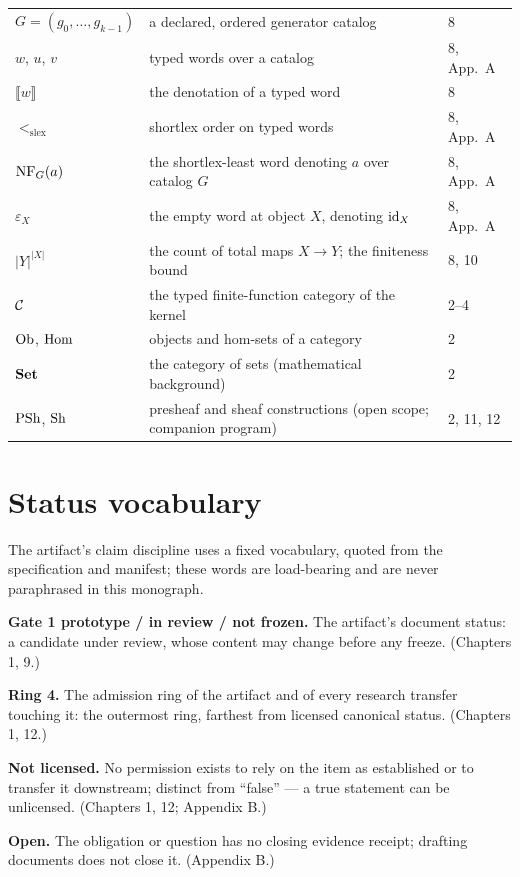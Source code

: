 \begin{longtable}{@{}lp{9.2cm}l@{}}
$G = (g_0, \dots, g_{k-1})$ & a declared, ordered generator catalog & 8 \\
$w$, $u$, $v$ & typed words over a catalog & 8, App.~A \\
$\llbracket w \rrbracket$ & the denotation of a typed word & 8 \\
$<_{\mathrm{slex}}$ & shortlex order on typed words & 8, App.~A \\
$\mathrm{NF}_G(a)$ & the shortlex-least word denoting $a$ over catalog $G$ & 8, App.~A \\
$\varepsilon_X$ & the empty word at object $X$, denoting $\mathrm{id}_X$ & 8, App.~A \\
$|Y|^{|X|}$ & the count of total maps $X \to Y$; the finiteness bound & 8, 10 \\
$\mathcal{C}$ & the typed finite-function category of the kernel & 2--4 \\
$\mathrm{Ob}$, $\mathrm{Hom}$ & objects and hom-sets of a category & 2 \\
$\mathbf{Set}$ & the category of sets (mathematical background) & 2 \\
$\mathrm{PSh}$, $\mathrm{Sh}$ & presheaf and sheaf constructions (open scope; companion program) & 2, 11, 12 \\
\bottomrule
\end{longtable}

\section{Status vocabulary}\label{appC:sec:status}

The artifact's claim discipline uses a fixed vocabulary, quoted from
the specification and manifest; these words are load-bearing and are
never paraphrased in this monograph.

\textbf{Gate 1 prototype / in review / not frozen.} The artifact's
document status: a candidate under review, whose content may change
before any freeze. (Chapters 1, 9.)

\textbf{Ring 4.} The admission ring of the artifact and of every
research transfer touching it: the outermost ring, farthest from
licensed canonical status. (Chapters 1, 12.)

\textbf{Not licensed.} No permission exists to rely on the item as
established or to transfer it downstream; distinct from ``false'' ---
a true statement can be unlicensed. (Chapters 1, 12; Appendix B.)

\textbf{Open.} The obligation or question has no closing evidence
receipt; drafting documents does not close it. (Appendix B.)

